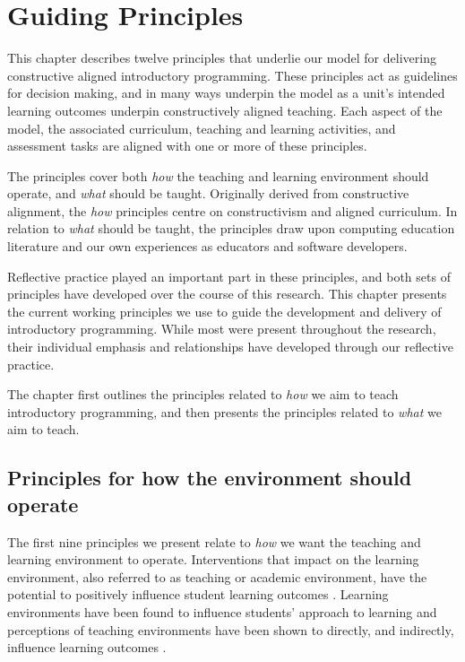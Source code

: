 
\chapter{Guiding Principles} %
\label{cha:guiding_principles}

\graphicspath{{Figures/CAApproach/}}

This chapter describes twelve principles that underlie our model for delivering constructive aligned introductory programming. These principles act as guidelines for decision making, and in many ways underpin the model as a unit's intended learning outcomes underpin constructively aligned teaching. Each aspect of the model, the associated curriculum, teaching and learning activities, and assessment tasks are aligned with one or more of these principles. 

The principles cover both \emph{how} the teaching and learning environment should operate, and \emph{what} should be taught. Originally derived from constructive alignment, the \emph{how} principles centre on constructivism and aligned curriculum. In relation to \emph{what} should be taught, the principles draw upon computing education literature and our own experiences as educators and software developers. 

Reflective practice played an important part in these principles, and both sets of principles have developed over the course of this research. This chapter presents the current working principles we use to guide the development and delivery of introductory programming. While most were present throughout the research, their individual emphasis and relationships have developed through our reflective practice. 

The chapter first outlines the principles related to \emph{how} we aim to teach introductory programming, and then presents the principles related to \emph{what} we aim to teach.



\section{Principles for how the environment should operate} %
\label{sub:principles_for_how_the_environment_should_operate}

The first nine principles we present relate to \emph{how} we want the teaching and learning environment to operate. Interventions that impact on the learning environment, also referred to as teaching or academic environment, have the potential to positively influence student learning outcomes \cite{Trigwell:1991}. Learning environments have been found to influence students' approach to learning \cite{Entwistle:1990,Entwistle:1991,Kember:2007} and perceptions of teaching environments have been shown to directly, and indirectly, influence learning outcomes \cite{Meyer:1990,Lizzio:2002}.

